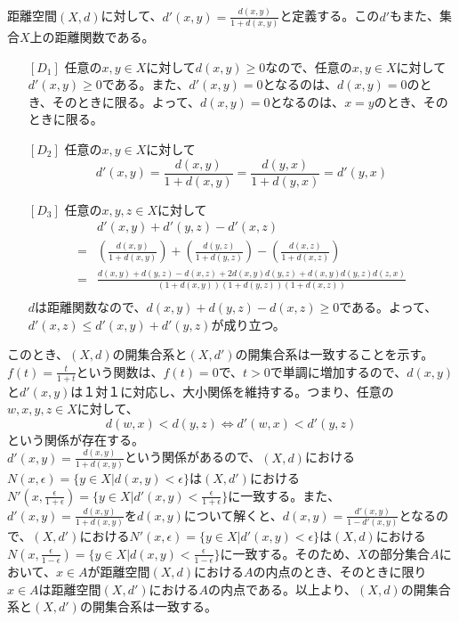 \documentclass{jsarticle}
\begin{document}
\subsection{}
距離空間$(X,d)$に対して、$d'(x,y)=\frac{d(x,y)}{1+d(x,y)}$と定義する。この$d'$もまた、集合$X$上の距離関数である。
\begin{enumerate}
\item[{$[D_1]$}]
任意の$x,y\in X$に対して$d(x,y)\geq 0$なので、任意の$x,y\in X$に対して$d'(x,y)\geq 0$である。また、$d'(x,y)=0$となるのは、$d(x,y)=0$のとき、そのときに限る。よって、$d(x,y)=0$となるのは、$x=y$のとき、そのときに限る。
\item[{$[D_2]$}]
任意の$x,y\in X$に対して
\[d'(x,y)=\frac{d(x,y)}{1+d(x,y)}=\frac{d(y,x)}{1+d(y,x)}=d'(y,x)\]
\item[{$[D_3]$}]
任意の$x,y,z\in X$に対して
\begin{align*}
& d'(x,y)+d'(y,z)-d'(x,z)\\
=&(\frac{d(x,y)}{1+d(x,y)})+(\frac{d(y,z)}{1+d(y,z)})-(\frac{d(x,z)}{1+d(x,z)})\\
=&\frac{d(x,y)+d(y,z)-d(x,z)+2d(x,y)d(y,z)+d(x,y)d(y,z)d(z,x)}{(1+d(x,y))(1+d(y,z))(1+d(x,z))}\\
\end{align*}
$d$は距離関数なので、$d(x,y)+d(y,z)-d(x,z)\geq 0$である。よって、$d'(x,z)\leq d'(x,y)+d'(y,z)$が成り立つ。
\end{enumerate}
このとき、$(X,d)$の開集合系と$(X,d')$の開集合系は一致することを示す。\\
$f(t)=\frac{t}{1+t}$という関数は、$f(t)=0$で、$t>0$で単調に増加するので、$d(x,y)$と$d'(x,y)$は１対１に対応し、大小関係を維持する。つまり、任意の$w,x,y,z\in X$に対して、\[d(w,x)<d(y,z)\Longleftrightarrow d'(w,x)<d'(y,z)\]という関係が存在する。\\
$d'(x,y)=\frac{d(x,y)}{1+d(x,y)}$という関係があるので、$(X,d)$における$N(x,\epsilon)=\{y\in X|d(x,y)<\epsilon\}$は$(X,d')$における$N'(x,\frac{\epsilon}{1+\epsilon})=\{y\in X|d'(x,y)<\frac{\epsilon}{1+\epsilon}\}$に一致する。また、$d'(x,y)=\frac{d(x,y)}{1+d(x,y)}$を$d(x,y)$について解くと、$d(x,y)=\frac{d'(x,y)}{1-d'(x,y)}$となるので、$(X,d')$における$N'(x,\epsilon)=\{y\in X|d'(x,y)<\epsilon\}$は$(X,d)$における$N(x,\frac{\epsilon}{1-\epsilon})=\{y\in X|d(x,y)<\frac{\epsilon}{1-\epsilon}\}$に一致する。そのため、$X$の部分集合$A$において、$x\in A$が距離空間$(X,d)$における$A$の内点のとき、そのときに限り$x\in A$は距離空間$(X,d')$における$A$の内点である。以上より、$(X,d)$の開集合系と$(X,d')$の開集合系は一致する。
\end{document}
